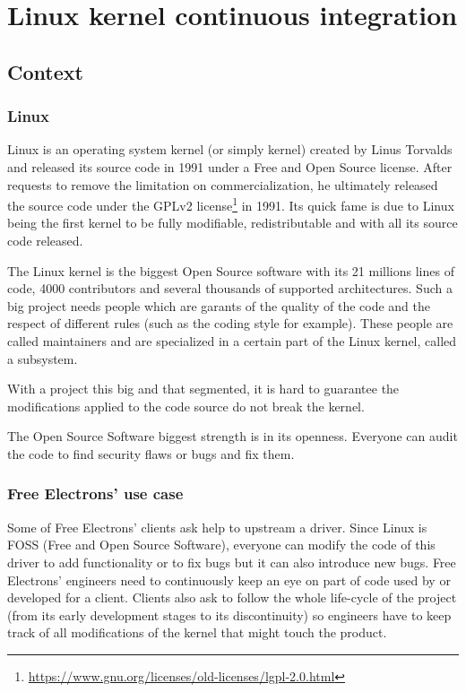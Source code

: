 \chapter{Linux kernel continuous integration}
\section{Context}
\subsection{Linux}
Linux is an operating system kernel (or simply kernel) created by Linus Torvalds and released its source code in 1991 under a Free and Open Source license. After requests to remove the limitation on commercialization, he ultimately released the source code under the GPLv2 license\footnote{\url{https://www.gnu.org/licenses/old-licenses/lgpl-2.0.html}} in 1991. Its quick fame is due to Linux being the first kernel to be fully modifiable, redistributable and with all its source code released.

The Linux kernel is the biggest Open Source software with its 21 millions lines of code, 4000 contributors and several thousands of supported architectures. Such a big project needs people which are garants of the quality of the code and the respect of different rules (such as the coding style for example). These people are called maintainers and are specialized in a certain part of the Linux kernel, called a subsystem.

With a project this big and that segmented, it is hard to guarantee the modifications applied to the code source do not break the kernel.

The Open Source Software biggest strength is in its openness. Everyone can audit the code to find security flaws or bugs and fix them.

\subsection{Free Electrons' use case}
Some of Free Electrons' clients ask help to upstream a driver. Since Linux is FOSS (Free and Open Source Software), everyone can modify the code of this driver to add functionality or to fix bugs but it can also introduce new bugs. Free Electrons' engineers need to continuously keep an eye on part of code used by or developed for a client. Clients also ask to follow the whole life-cycle of the project (from its early development stages to its discontinuity) so engineers have to keep track of all modifications of the kernel that might touch the product.

